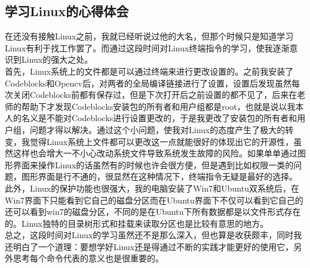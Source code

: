 \documentclass[12pt]{article}
\begin{document}
\subsection{学习Linux的心得体会}
\begin{flushleft}
在还没有接触Linux之前，我就已经听说过他的大名，但那个时候只是知道学习Linux有利于找工作罢了。而通过这段时间对Linux终端指令的学习，使我逐渐意识到Linux的强大之处。\\
首先，Linux系统上的文件都是可以通过终端来进行更改设置的。之前我安装了Codeblocks和Opencv后，对两者的全局编译链接进行了设置，设置后发现虽然每次关闭Codeblocks前都有保存过，但是下次打开后之前设置的都不见了，后来在老师的帮助下才发现Codeblocks安装包的所有者和用户组都是root，也就是说以我本人的名义是不能对Codeblocks进行设置更改的，于是我更改了安装包的所有者和用户组，问题才得以解决。通过这个小问题，使我对Linux的态度产生了极大的转变，我觉得Linux系统上文件都可以更改这一点就能很好的体现出它的开源性，虽然这样也会增大一不小心改动系统文件导致系统发生故障的风险。如果单单通过图形界面来操作Linux的话虽然有的时候也许会很方便，但是遇到比如权限一类的问题，图形界面是行不通的，很显然在这种情况下，终端指令无疑是最好的选择。\\
此外，Linux的保护功能也很强大，我的电脑安装了Win7和Ubuntu双系统后，在Win7界面下只能看到它自己的磁盘分区而在Ubuntu界面下不仅可以看到它自己的还可以看到win7的磁盘分区，不同的是在Ubuntu下所有数据都是以文件形式存在的。Linux独特的目录树形式和挂载来读取分区也是比较有意思的地方。\\
总之，这段时间对Linux的学习虽然还不是那么深入，但也算是收获颇丰，同时我还明白了一个道理：要想学好Linux还是得通过不断的实践才能更好的使用它，另外思考每个命令代表的意义也是很重要的。
\end{flushleft}












\end{document}
